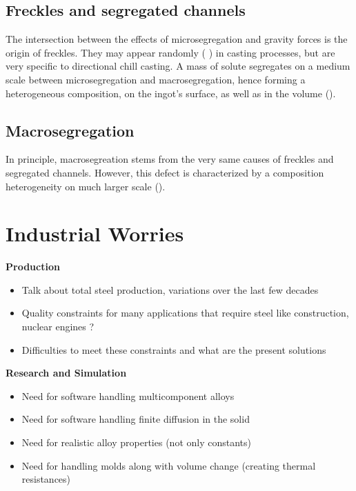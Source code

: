 \subsection*{Freckles and segregated channels} 
The intersection between the effects of microsegregation and gravity forces is the origin of freckles. They may appear 
randomly ( ) in casting processes, but are very specific to directional chill casting. A mass of solute 
segregates on a medium scale between microsegregation and macrosegregation, hence forming a heterogeneous composition, 
on the ingot's surface, as well as in the volume ().

\subsection*{Macrosegregation}
In principle, macrosegreation stems from the very same causes of freckles and segregated channels. However, this defect is characterized by a composition heterogeneity on much larger scale (). 

\section*{Industrial Worries}
\textbf{Production}

\begin{itemize}
\item Talk about total steel production, variations over the last few decades
\item Quality constraints for many applications that require steel like construction, nuclear engines ? 
\item Difficulties to meet these constraints and what are the present solutions
\end{itemize}
\textbf{Research and Simulation}
\begin{itemize}
\item Need for software handling multicomponent alloys
\item Need for software handling finite diffusion in the solid
\item Need for realistic alloy properties (not only constants)
\item Need for handling molds along with volume change (creating thermal resistances)
\end{itemize}

